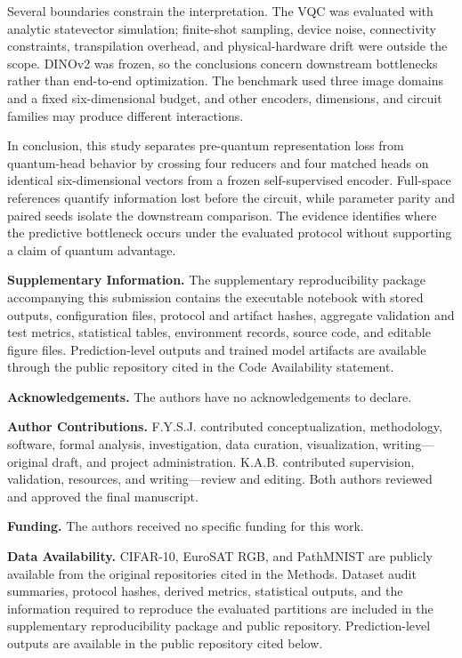 \documentclass[pdflatex,sn-mathphys-ay]{sn-jnl}
\begin{document}
Several boundaries constrain the interpretation. The VQC was evaluated with analytic statevector simulation; finite-shot sampling, device noise, connectivity constraints, transpilation overhead, and physical-hardware drift were outside the scope. DINOv2 was frozen, so the conclusions concern downstream bottlenecks rather than end-to-end optimization. The benchmark used three image domains and a fixed six-dimensional budget, and other encoders, dimensions, and circuit families may produce different interactions.


In conclusion, this study separates pre-quantum representation loss from quantum-head behavior by crossing four reducers and four matched heads on identical six-dimensional vectors from a frozen self-supervised encoder. Full-space references quantify information lost before the circuit, while parameter parity and paired seeds isolate the downstream comparison. The evidence identifies where the predictive bottleneck occurs under the evaluated protocol without supporting a claim of quantum advantage.


\textbf{Supplementary Information.} The supplementary reproducibility package accompanying this submission contains the executable notebook with stored outputs, configuration files, protocol and artifact hashes, aggregate validation and test metrics, statistical tables, environment records, source code, and editable figure files. Prediction-level outputs and trained model artifacts are available through the public repository cited in the Code Availability statement.


\textbf{Acknowledgements.} The authors have no acknowledgements to declare.


\textbf{Author Contributions.} F.Y.S.J. contributed conceptualization, methodology, software, formal analysis, investigation, data curation, visualization, writing---original draft, and project administration. K.A.B. contributed supervision, validation, resources, and writing---review and editing. Both authors reviewed and approved the final manuscript.


\textbf{Funding.} The authors received no specific funding for this work.


\textbf{Data Availability.} CIFAR-10, EuroSAT RGB, and PathMNIST are publicly available from the original repositories cited in the Methods. Dataset audit summaries, protocol hashes, derived metrics, statistical outputs, and the information required to reproduce the evaluated partitions are included in the supplementary reproducibility package and public repository. Prediction-level outputs are available in the public repository cited below.
\end{document}
